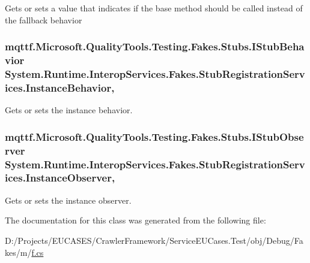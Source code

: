 Gets or sets a value that indicates if the base method should be called instead of the fallback behavior

\hypertarget{class_system_1_1_runtime_1_1_interop_services_1_1_fakes_1_1_stub_registration_services_a2c859bd312a0b4ddd2cacfc623812dde}{
\subsubsection[{Instance\-Behavior}]{\setlength{\rightskip}{0pt plus 5cm}mqttf.\-Microsoft.\-Quality\-Tools.\-Testing.\-Fakes.\-Stubs.\-I\-Stub\-Behavior System.\-Runtime.\-Interop\-Services.\-Fakes.\-Stub\-Registration\-Services.\-Instance\-Behavior\hspace{0.3cm}{\ttfamily [get]}, {\ttfamily [set]}}}\label{class_system_1_1_runtime_1_1_interop_services_1_1_fakes_1_1_stub_registration_services_a2c859bd312a0b4ddd2cacfc623812dde}


Gets or sets the instance behavior.

\hypertarget{class_system_1_1_runtime_1_1_interop_services_1_1_fakes_1_1_stub_registration_services_a004dc6bffc53edd02ca4081497ad2519}{
\subsubsection[{Instance\-Observer}]{\setlength{\rightskip}{0pt plus 5cm}mqttf.\-Microsoft.\-Quality\-Tools.\-Testing.\-Fakes.\-Stubs.\-I\-Stub\-Observer System.\-Runtime.\-Interop\-Services.\-Fakes.\-Stub\-Registration\-Services.\-Instance\-Observer\hspace{0.3cm}{\ttfamily [get]}, {\ttfamily [set]}}}\label{class_system_1_1_runtime_1_1_interop_services_1_1_fakes_1_1_stub_registration_services_a004dc6bffc53edd02ca4081497ad2519}


Gets or sets the instance observer.



The documentation for this class was generated from the following file\-:\begin{DoxyCompactItemize}
\item 
D\-:/\-Projects/\-E\-U\-C\-A\-S\-E\-S/\-Crawler\-Framework/\-Service\-E\-U\-Cases.\-Test/obj/\-Debug/\-Fakes/m/\hyperlink{m_2f_8cs}{f.\-cs}\end{DoxyCompactItemize}

